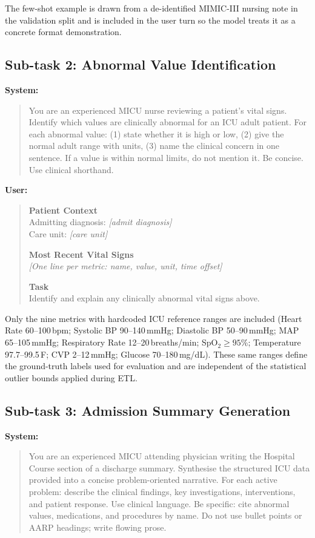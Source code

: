 \documentclass[sigconf,anonymous=false,review=false]{acmart}
\begin{document}
The few-shot example is drawn from a de-identified MIMIC-III nursing note
in the validation split and is included in the user turn so the model
treats it as a concrete format demonstration.

\subsection*{Sub-task 2: Abnormal Value Identification}

\textbf{System:}
\begin{quote}
\small
You are an experienced MICU nurse reviewing a patient's vital signs.
Identify which values are clinically abnormal for an ICU adult patient.
For each abnormal value: (1) state whether it is high or low,
(2) give the normal adult range with units,
(3) name the clinical concern in one sentence.
If a value is within normal limits, do not mention it.
Be concise. Use clinical shorthand.
\end{quote}

\textbf{User:}
\begin{quote}
\small
\textbf{Patient Context}\\
Admitting diagnosis: \textit{[admit diagnosis]}\\
Care unit: \textit{[care unit]}

\medskip
\textbf{Most Recent Vital Signs}\\
\textit{[One line per metric: name, value, unit, time offset]}

\medskip
\textbf{Task}\\
Identify and explain any clinically abnormal vital signs above.
\end{quote}

Only the nine metrics with hardcoded ICU reference ranges are included
(Heart Rate 60--100\,bpm; Systolic BP 90--140\,mmHg; Diastolic BP
50--90\,mmHg; MAP 65--105\,mmHg; Respiratory Rate 12--20\,breaths/min;
SpO$_2 \geq 95$\%; Temperature 97.7--99.5\,\textdegree F;
CVP 2--12\,mmHg; Glucose 70--180\,mg/dL). These same ranges define the
ground-truth labels used for evaluation and are independent of the
statistical outlier bounds applied during ETL.

\subsection*{Sub-task 3: Admission Summary Generation}

\textbf{System:}
\begin{quote}
\small
You are an experienced MICU attending physician writing the Hospital Course
section of a discharge summary. Synthesise the structured ICU data provided
into a concise problem-oriented narrative. For each active problem: describe
the clinical findings, key investigations, interventions, and patient
response. Use clinical language. Be specific: cite abnormal values,
medications, and procedures by name. Do not use bullet points or AARP
headings; write flowing prose.
\end{quote}
\end{document}
